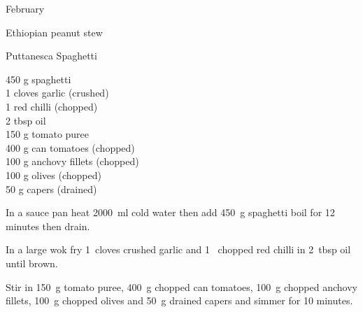 \begin{menu}{February}
\begin{recipe}{2}{Ethiopian peanut stew}
\begin{instructions}
    \end{instructions}
    \end{recipe}%
  
    \begin{recipe}{1}{Puttanesca Spaghetti}%
    
		\begin{ingredients}
		450 g spaghetti  \\
	1 cloves garlic (crushed) \\
	1  red chilli (chopped) \\
	2 tbsp oil  \\
	150 g tomato puree  \\
	400 g can tomatoes (chopped) \\
	100 g anchovy fillets (chopped) \\
	100 g olives (chopped) \\
	50 g capers (drained) \\
	
		\end{ingredients}
	
    \begin{instructions}
    \item 
      In a sauce pan heat
      2000~ml  cold water then add
      450~g  spaghetti
      boil for 12
      minutes then drain.
    \item 
        In a large wok fry
        1~cloves crushed garlic
        and
        1~ chopped red chilli
        in
        2~tbsp  oil
        until brown.
      \item 
        Stir in
        150~g  tomato puree,
        400~g chopped can tomatoes,
        100~g chopped anchovy fillets,
        100~g chopped olives
        and
        50~g drained capers
        and simmer for 10 minutes.
      
    \end{instructions}
    \end{recipe}%
  
    \clearpage
    \end{menu}
	
